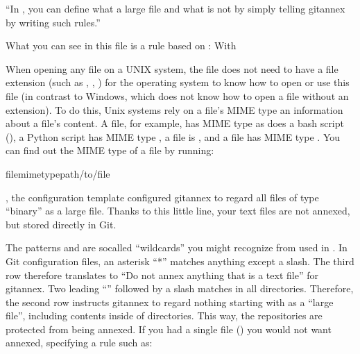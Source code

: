 \sphinxAtStartPar
“In , you can define what a large file and what is not
by simply telling git\sphinxhyphen{}annex by writing such rules.”

\sphinxAtStartPar
What you can see in this  file is a rule based on :
With %
\begin{footnote}\sphinxAtStartFootnote
When opening any file on a UNIX system, the file does not need to have a file
extension (such as , , ) for the operating system to know
how to open or use this file (in contrast to Windows, which does not know how to
open a file without an extension). To do this, Unix systems rely on a file’s
MIME type \textendash{} an information about a file’s content. A  file, for example,
has MIME type  as does a bash script (), a Python
script has MIME type , a  file is , and
a  file has MIME type . You can find out the MIME type
of a file by running:

\sphinxSetupCodeBlockInFootnote
\begin{sphinxVerbatim}[commandchars=\\\{\}]
file\PYGZhy{}\PYGZhy{}mime\PYGZhy{}typepath/to/file
\end{sphinxVerbatim}
%
\end{footnote}, the  configuration template
configured git\sphinxhyphen{}annex to regard all files of type “binary” as a large file.
Thanks to this little line, your text files are not annexed, but stored
directly in Git.

\sphinxAtStartPar
The patterns \sphinxcode{\sphinxupquote{*}} and \sphinxcode{\sphinxupquote{**}} are so\sphinxhyphen{}called “wildcards” you might recognize from used in {\hyperref[\detokenize{glossary:term-globbing}]{}}.
In Git configuration files, an asterisk “*” matches anything except a slash.
The third row therefore
translates to “Do not annex anything that is a text file” for git\sphinxhyphen{}annex.
Two leading “\sphinxcode{\sphinxupquote{**}}” followed by a slash matches
 in all directories.
Therefore, the second row instructs git\sphinxhyphen{}annex to regard nothing starting with  as a “large file”, including contents inside of  directories.
This way, the  repositories are protected from being annexed.
If you had a single file () you would not want annexed, specifying a rule such as:

